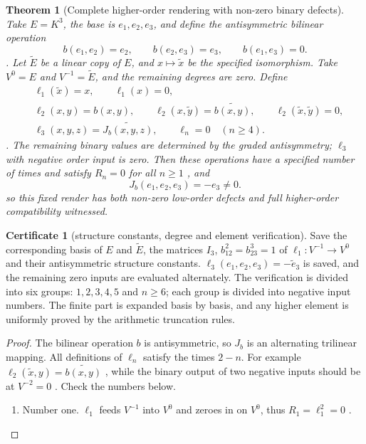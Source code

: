 \documentclass[12pt,a4paper,openany,notitlepage]{report}
\theoremstyle{plain}
\newtheorem{theorem}{Theorem}[chapter]
\theoremstyle{definition}
\newtheorem*{certificate}{Certificate}
\theoremstyle{remark}
\def\mathcal#1{#1}\def\mathsf#1{#1}\def\mathbb#1{#1}%
\begin{document}
\begin{CJK*}
\begin{theorem}
[Complete higher-order rendering with non-zero binary defects]\label{hgov:linfty:model}
Take $E=\mathbb K^3$, the base is $e_1,e_2,e_3$, and define the antisymmetric bilinear operation \[
b(e_1,e_2)=e_2,\qquad b(e_2,e_3)=e_3,\qquad b(e_1,e_3)=0.
\]. Let $\widetilde E$ be a linear copy of $E$, and $x\mapsto\widetilde x$ be the specified isomorphism. Take $V^0=E$ and $V^{-1}=\widetilde E$, and the remaining degrees are zero. Define \[
\begin{aligned}
&\ell_1(\widetilde x)=x,\qquad \ell_1(x)=0,\\
&\ell_2(x,y)=b(x,y),\qquad
\ell_2(x,\widetilde y)=\widetilde{b(x,y)},\qquad
\ell_2(\widetilde x,\widetilde y)=0,\\
&\ell_3(x,y,z)=\widetilde{J_b(x,y,z)},\qquad
\ell_n=0\quad(n\ge4).
\end{aligned}
\]. The remaining binary values are determined by the graded antisymmetry; $\ell_3$ with negative order input is zero. Then these operations have a specified number of times and satisfy $\mathcal R_n=0$ for all $n\ge1$ , and \[
J_b(e_1,e_2,e_3)=-e_3\ne0.
\] so this fixed render has both non-zero low-order defects and full higher-order compatibility witnessed.\end{theorem}


\begin{certificate}
[structure constants, degree and element verification]\label{hgov:linfty:model-certificate}
Save the corresponding basis of $E$ and $\widetilde E$, the matrices $I_3$, $b_{12}^{2}=b_{23}^{3}=1$ of $\ell_1:V^{-1}\to V^0$ and their antisymmetric structure constants. $\ell_3(e_1,e_2,e_3)=-\widetilde e_3$ is saved, and the remaining zero inputs are evaluated alternately. The verification is divided into six groups: $1,2,3,4,5$ and $n\ge6$; each group is divided into negative input numbers. The finite part is expanded basis by basis, and any higher element is uniformly proved by the arithmetic truncation rules.\end{certificate}


\begin{proof}
The bilinear operation $b$ is antisymmetric, so $J_b$ is an alternating trilinear mapping. All definitions of $\ell_n$ satisfy the times $2-n$. For example $\ell_2(\widetilde x,y)=\widetilde{b(x,y)}$ , while the binary output of two negative inputs should be at $V^{-2}=0$ . Check the numbers below.

\begin{enumerate}
\item
Number one. $\ell_1$ feeds $V^{-1}$ into $V^0$ and zeroes in on $V^0$, thus $\mathcal R_1=\ell_1^2=0$ .


\end{enumerate}
\end{proof}
\end{CJK*}
\end{document}
